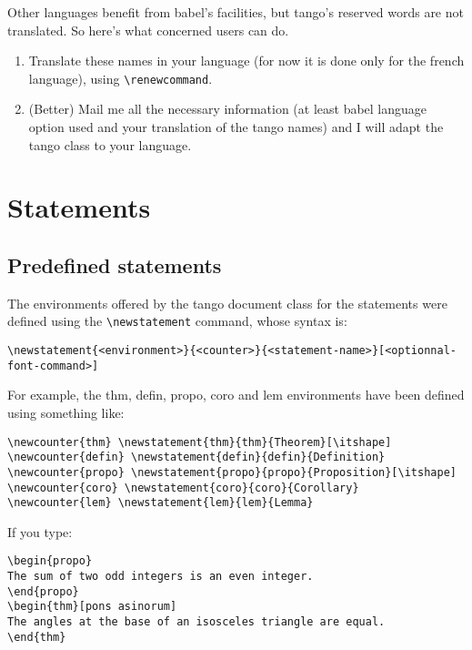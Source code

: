 \documentclass[english,ColorTheme=Red,FontSize=10pt]{tango}
\newcommand\TO[1]{\textsf{#1}}
\begin{document}
Other languages benefit from babel's facilities, but tango's reserved words are not translated.
So here's what concerned users can do.

\begin{enumerate}
\item Translate these names in your language (for now it is done only for the french language), using \verb+\renewcommand+. 
\item (Better) Mail me  all the necessary information (at least babel language option used and your translation of the tango names) and I will adapt the tango class to your language.
\end{enumerate}
\section{Statements}\label{st-section}

\subsection{Predefined statements}
The environments offered by the tango document class for the statements were defined using the \verb+\newstatement+ command, whose syntax is:
\begin{tcolorbox}
\begin{verbatim}
\newstatement{<environment>}{<counter>}{<statement-name>}[<optionnal-font-command>]
\end{verbatim}
\end{tcolorbox}
For example, the \TO{thm}, \TO{defin}, \TO{propo}, \TO{coro} and \TO{lem} environments have been defined using something like:
\begin{tcolorbox}
\begin{verbatim}
\newcounter{thm} \newstatement{thm}{thm}{Theorem}[\itshape]
\newcounter{defin} \newstatement{defin}{defin}{Definition}
\newcounter{propo} \newstatement{propo}{propo}{Proposition}[\itshape]
\newcounter{coro} \newstatement{coro}{coro}{Corollary}
\newcounter{lem} \newstatement{lem}{lem}{Lemma}
\end{verbatim}
\end{tcolorbox}


If you type:

\begin{tcolorbox}
\begin{verbatim}
\begin{propo}
The sum of two odd integers is an even integer.
\end{propo}
\begin{thm}[pons asinorum]
The angles at the base of an isosceles triangle are equal.
\end{thm}
\end{verbatim}
\end{tcolorbox}
\end{document}
